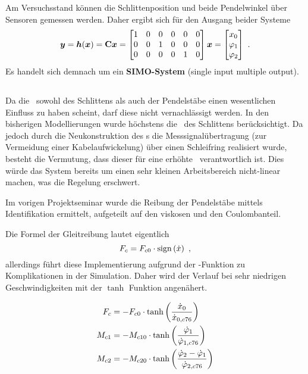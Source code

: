 Am Versuchsstand können die Schlittenposition und beide Pendelwinkel über Sensoren gemessen werden. Daher ergibt sich für den Ausgang beider Systeme
\begin{align}
	\boldsymbol{y} = \boldsymbol{h}(\boldsymbol{x})
	= {\boldsymbol{\mathrm{C}}} \boldsymbol{x}
	= \begin{bmatrix}
		1 & 0 & 0 & 0 & 0 & 0 \\
		0 & 0 & 1 & 0 & 0 & 0 \\
		0 & 0 & 0 & 0 & 1 & 0 
	\end{bmatrix} \boldsymbol{x}
	= \begin{bmatrix}
		x_0 \\ \varphi_1 \\ \varphi_2
	\end{bmatrix}  \ .
	\label{eq:hx}
\end{align}
Es handelt sich demnach um ein \textbf{SIMO-System} (single input multiple output). 


\subsection{\crb}\label{sec:crb}

Da die \crb\ sowohl des Schlittens als auch der Pendelstäbe einen wesentlichen Einfluss zu haben scheint, darf diese nicht vernachlässigt werden. 
In den bisherigen Modellierungen wurde höchstens die \crb\ des Schlittens berücksichtigt. 
Da jedoch durch die Neukonstruktion des \dpd s die Messsignalübertragung (zur Vermeidung einer Kabelaufwickelung) über einen Schleifring realisiert wurde, besteht die Vermutung, dass dieser für eine erhöhte \crb\ verantwortlich ist. 
Dies würde das System bereits um einen sehr kleinen Arbeitsbereich nicht-linear machen, was die Regelung erschwert.

Im vorigen Projektseminar \cite{ribeiro} wurde die Reibung der Pendelstäbe mittels Identifikation ermittelt, aufgeteilt auf den viskosen und den Coulombanteil.

Die Formel der Gleitreibung lautet eigentlich 
	\[
	F_c = F_{c0}  \cdot  \mathrm{sign}\left(\dot{x}\right) \ ,
\]
allerdings führt diese Implementierung aufgrund der -Funktion zu Komplikationen in der Simulation. 
Daher wird der Verlauf bei sehr niedrigen Geschwindigkeiten mit der $\tanh$ Funktion angenähert.

\begin{align}
	F_c  &= -F_{c0}  \cdot \tanh{\left(\frac{\ensuremath{\dot{x}_0}}{\ensuremath{\dot{x}_{0,c76}}}\right)}  \\
	M_{c1} &= -M_{c10} \cdot \tanh{\left(\frac{\ensuremath{\dot{\varphi}_1}}{\ensuremath{\dot{\varphi}_{1,c76}}}\right)}  \\
	M_{c2} &= -M_{c20} \cdot \tanh{\left(\frac{\ensuremath{\dot{\varphi}_2}-\ensuremath{\dot{\varphi}_1}}{\ensuremath{\dot{\varphi}_{2,c76}}}\right)}
\end{align}


